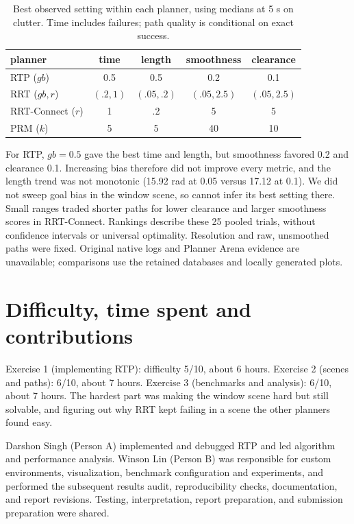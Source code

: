 \documentclass{comp450}
\begin{document}
\begin{table}[h]
\centering
\small
\begin{tabular}{lcccc}
\toprule
planner & time & length & smoothness & clearance \\
\midrule
RTP ($gb$) & 0.5 & 0.5 & 0.2 & 0.1 \\
RRT ($gb,r$) & $(.2,1)$ & $(.05,.2)$ & $(.05,2.5)$ & $(.05,2.5)$ \\
RRT-Connect ($r$) & 1 & .2 & 5 & 5 \\
PRM ($k$) & 5 & 5 & 40 & 10 \\
\bottomrule
\end{tabular}
\caption{Best observed setting within each planner, using medians at 5 s on clutter. Time includes failures; path quality is conditional on exact success.}
\label{tab:best}
\end{table}

For RTP, $gb=0.5$ gave the best time and length, but smoothness favored 0.2 and clearance 0.1. Increasing bias therefore did not improve every metric, and the length trend was not monotonic (15.92 rad at 0.05 versus 17.12 at 0.1). We did not sweep goal bias in the window scene, so cannot infer its best setting there. Small ranges traded shorter paths for lower clearance and larger smoothness scores in RRT-Connect. Rankings describe these 25 pooled trials, without confidence intervals or universal optimality. Resolution and raw, unsmoothed paths were fixed. Original native logs and Planner Arena evidence are unavailable; comparisons use the retained databases and locally generated plots.

\section*{Difficulty, time spent and contributions}

Exercise 1 (implementing RTP): difficulty 5/10, about 6 hours. Exercise 2 (scenes and paths): 6/10, about 7 hours. Exercise 3 (benchmarks and analysis): 6/10, about 7 hours. The hardest part was making the window scene hard but still solvable, and figuring out why RRT kept failing in a scene the other planners found easy.

Darshon Singh (Person A) implemented and debugged RTP and led algorithm and performance analysis. Winson Lin (Person B) was responsible for custom environments, visualization, benchmark configuration and experiments, and performed the subsequent results audit, reproducibility checks, documentation, and report revisions. Testing, interpretation, report preparation, and submission preparation were shared.
\end{document}
